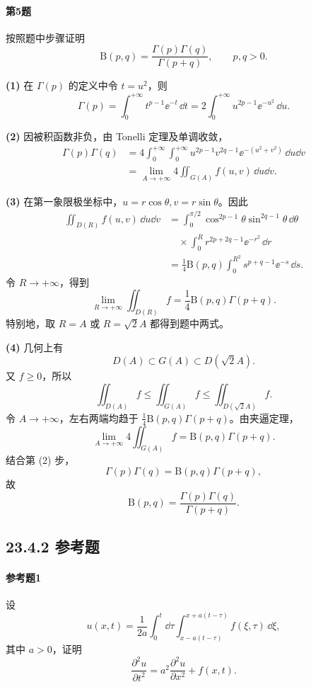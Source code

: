 \paragraph{第5题}
按照题中步骤证明
\[
\mathrm{B}(p,q)=\frac{\Gamma(p)\Gamma(q)}{\Gamma(p+q)},
\qquad p,q>0.
\]

\begin{xsolution}
\textbf{(1)} 在 $\Gamma(p)$ 的定义中令 $t=u^2$，则
\[
\Gamma(p)=\int_0^{+\infty}t^{p-1}\ee^{-t}\,\dd t
=2\int_0^{+\infty}u^{2p-1}\ee^{-u^2}\,\dd u.
\]

\textbf{(2)} 因被积函数非负，由 Tonelli 定理及单调收敛，
\[
\begin{aligned}
\Gamma(p)\Gamma(q)
&=4\int_0^{+\infty}\int_0^{+\infty}
 u^{2p-1}v^{2q-1}\ee^{-(u^2+v^2)}\,\dd u\dd v\\
&=\lim_{A\to+\infty}4\iint_{G(A)}f(u,v)\,\dd u\dd v.
\end{aligned}
\]

\textbf{(3)} 在第一象限极坐标中，$u=r\cos\theta,v=r\sin\theta$。因此
\[
\begin{aligned}
\iint_{D(R)}f(u,v)\,\dd u\dd v
&=\int_0^{\pi/2}\cos^{2p-1}\theta\sin^{2q-1}\theta\,\dd\theta\\
&\quad\times\int_0^R r^{2p+2q-1}\ee^{-r^2}\,\dd r\\
&=\frac14\mathrm{B}(p,q)
\int_0^{R^2}s^{p+q-1}\ee^{-s}\,\dd s.
\end{aligned}
\]
令 $R\to+\infty$，得到
\[
\lim_{R\to+\infty}\iint_{D(R)}f
=\frac14\mathrm{B}(p,q)\Gamma(p+q).
\]
特别地，取 $R=A$ 或 $R=\sqrt2A$ 都得到题中两式。

\textbf{(4)} 几何上有
\[
D(A)\subset G(A)\subset D(\sqrt2A).
\]
又 $f\geqslant0$，所以
\[
\iint_{D(A)}f\leqslant\iint_{G(A)}f
\leqslant\iint_{D(\sqrt2A)}f.
\]
令 $A\to+\infty$，左右两端均趋于
$\frac14\mathrm{B}(p,q)\Gamma(p+q)$。由夹逼定理，
\[
\lim_{A\to+\infty}4\iint_{G(A)}f
=\mathrm{B}(p,q)\Gamma(p+q).
\]
结合第 (2) 步，
\[
\Gamma(p)\Gamma(q)=\mathrm{B}(p,q)\Gamma(p+q),
\]
故
\[
\boxed{\mathrm{B}(p,q)=\frac{\Gamma(p)\Gamma(q)}{\Gamma(p+q)}}.
\]
\end{xsolution}

\subsection*{23.4.2 参考题}

\paragraph{参考题1}
设
\[
u(x,t)=\frac1{2a}\int_0^t\dd\tau
\int_{x-a(t-\tau)}^{x+a(t-\tau)}f(\xi,\tau)\,\dd\xi,
\]
其中 $a>0$，证明
\[
\frac{\partial^2u}{\partial t^2}
=a^2\frac{\partial^2u}{\partial x^2}+f(x,t).
\]

